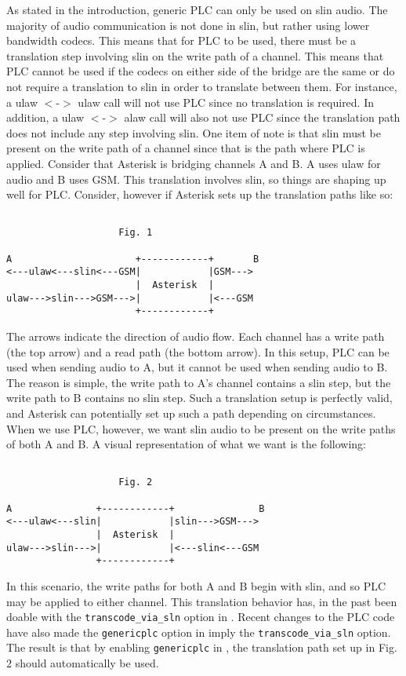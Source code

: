 	As stated in the introduction, generic PLC can only be used on slin audio.
The majority of audio communication is not done in slin, but rather using lower
bandwidth codecs. This means that for PLC to be used, there must be a translation
step involving slin on the write path of a channel. This means that PLC cannot
be used if the codecs on either side of the bridge are the same or do not require
a translation to slin in order to translate between them. For instance, a
ulaw $<$-$>$ ulaw call will not use PLC since no translation is required. In addition,
a ulaw $<$-$>$ alaw call will also not use PLC since the translation path does not
include any step involving slin.
	One item of note is that slin must be present on the write path of a channel
since that is the path where PLC is applied. Consider that Asterisk is bridging
channels A and B. A uses ulaw for audio and B uses GSM. This translation involves
slin, so things are shaping up well for PLC. Consider, however if Asterisk sets
up the translation paths like so:
\begin{verbatim}

                    Fig. 1

A                      +------------+       B
<---ulaw<---slin<---GSM|            |GSM--->
                       |  Asterisk  |
ulaw--->slin--->GSM--->|            |<---GSM
                       +------------+

\end{verbatim}
	The arrows indicate the direction of audio flow. Each channel has a write
path (the top arrow) and a read path (the bottom arrow). In this setup, PLC
can be used when sending audio to A, but it cannot be used when sending audio
to B. The reason is simple, the write path to A's channel contains a slin
step, but the write path to B contains no slin step. Such a translation setup
is perfectly valid, and Asterisk can potentially set up such a path depending
on circumstances. When we use PLC, however, we want slin audio to be present
on the write paths of both A and B. A visual representation of what we want
is the following:
\begin{verbatim}

                    Fig. 2

A               +------------+               B
<---ulaw<---slin|            |slin--->GSM--->
                |  Asterisk  |
ulaw--->slin--->|            |<---slin<---GSM
                +------------+

\end{verbatim}
	In this scenario, the write paths for both A and B begin with slin,
and so PLC may be applied to either channel. This translation behavior has,
in the past been doable with the \texttt{transcode\_via\_sln} option in .
Recent changes to the PLC code have also made the \texttt{genericplc} option in
 imply the \texttt{transcode\_via\_sln} option. The result is that by
enabling \texttt{genericplc} in , the translation path set up in
Fig. 2 should automatically be used.

